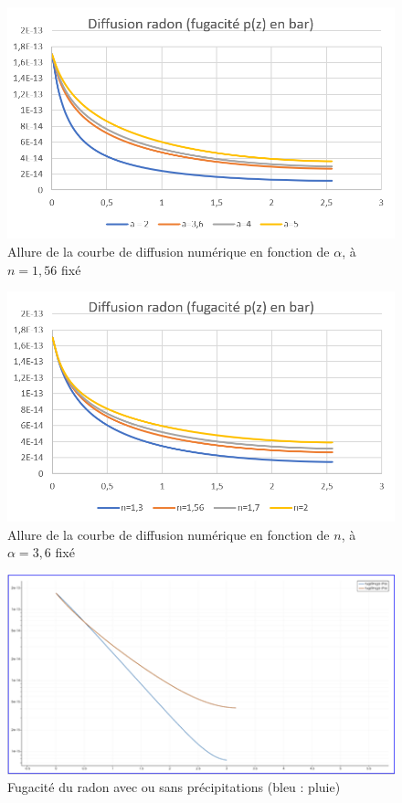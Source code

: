 \documentclass{article}
\begin{document}
\begin{figure}[H]
    \centering
    \includegraphics[height = 0.26 \textheight]{III_C_11.png}
    \caption{Allure de la courbe de diffusion numérique en fonction de $\alpha$, à $n=1,56$ fixé}
    \label{fig:sens_hytec_alpha}
\end{figure}
\begin{figure}[H]
    \centering
    \includegraphics[height = 0.26 \textheight]{III_C_12.png}
    \caption{Allure de la courbe de diffusion numérique en fonction de $n$, à $\alpha=3,6$ fixé}
    \label{fig:sens_hytec_n}
\end{figure}
\begin{figure}[H]
    \centering
    \includegraphics[height = 0.25 \textheight]{III_C_6.png}
    \caption{Fugacité du radon avec ou sans précipitations (bleu : pluie)}
    \label{fig:rain_fugacity}
\end{figure}
\end{document}
